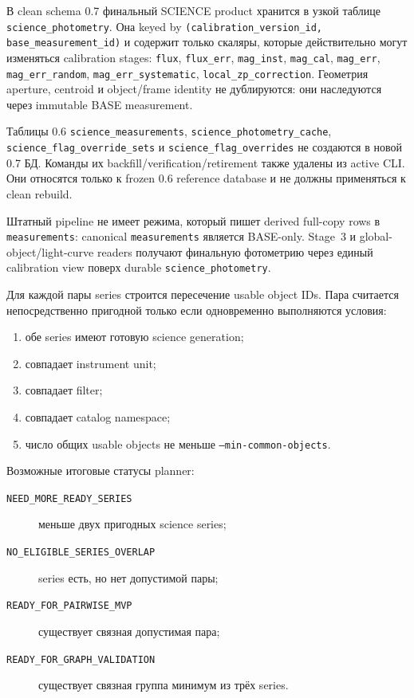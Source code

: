 В clean schema 0.7 финальный SCIENCE product хранится в узкой таблице
\texttt{science\_photometry}. Она keyed by
\texttt{(calibration\_version\_id, base\_measurement\_id)} и содержит только
скаляры, которые действительно могут изменяться calibration stages:
\texttt{flux}, \texttt{flux\_err}, \texttt{mag\_inst}, \texttt{mag\_cal},
\texttt{mag\_err}, \texttt{mag\_err\_random},
\texttt{mag\_err\_systematic}, \texttt{local\_zp\_correction}.
Геометрия aperture, centroid и object/frame identity не дублируются: они
наследуются через immutable BASE measurement.

Таблицы 0.6 \texttt{science\_measurements},
\texttt{science\_photometry\_cache}, \texttt{science\_flag\_override\_sets} и
\texttt{science\_flag\_overrides} не создаются в новой 0.7 БД. Команды их
backfill/verification/retirement также удалены из active CLI. Они относятся
только к frozen 0.6 reference database и не должны применяться к clean rebuild.

Штатный pipeline не имеет режима, который пишет derived full-copy rows в
\texttt{measurements}: canonical \texttt{measurements} является BASE-only.
Stage~3 и global-object/light-curve readers получают финальную фотометрию через
единый calibration view поверх durable \texttt{science\_photometry}.

Для каждой пары series строится пересечение usable object IDs. Пара считается непосредственно пригодной только если одновременно выполняются условия:

\begin{enumerate}
  \item обе series имеют готовую science generation;
  \item совпадает instrument unit;
  \item совпадает filter;
  \item совпадает catalog namespace;
  \item число общих usable objects не меньше \texttt{--min-common-objects}.
\end{enumerate}

Возможные итоговые статусы planner:

\begin{description}
  \item[\texttt{NEED\_MORE\_READY\_SERIES}] меньше двух пригодных science series;
  \item[\texttt{NO\_ELIGIBLE\_SERIES\_OVERLAP}] series есть, но нет допустимой пары;
  \item[\texttt{READY\_FOR\_PAIRWISE\_MVP}] существует связная допустимая пара;
  \item[\texttt{READY\_FOR\_GRAPH\_VALIDATION}] существует связная группа минимум из трёх series.
\end{description}

